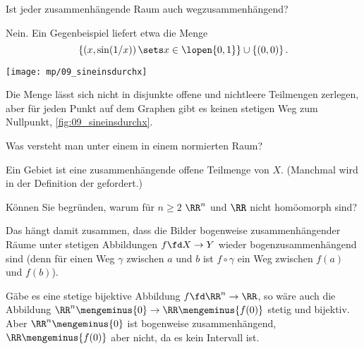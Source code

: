 \begin{frage}
  Ist jeder zusammenhängende Raum auch wegzusammenhängend?
\end{frage}

\begin{antwort}
  Nein. Ein Gegenbeispiel liefert etwa die Menge  
  \[
  \left\{  \left(x, \sin (1/x) \right)\sets 
    x\in \lopen{0,1} \right\} \cup 
  \left\{ ( 0, 0 ) \right\}.
  \]

  \begin{center}
    \texttt{[image: mp/09\_sineinsdurchx]}
    \label{fig:09_sineinsdurchx}
  \end{center}

  Die Menge lässt sich nicht in disjunkte offene 
  und nichtleere Teilmengen zerlegen, aber für jeden Punkt auf 
  dem Graphen gibt es keinen stetigen Weg zum Nullpunkt, \sieheAbbildung 
  \ref{fig:09_sineinsdurchx}.
  \AntEnd
\end{antwort}

\begin{frage}
  Was versteht man unter einem  in einem normierten Raum?
\end{frage}

\begin{antwort}
  Ein Gebiet ist eine zusammenhängende offene Teilmenge von $X$. 
  (Manchmal wird in der Definition der  
  gefordert.)
  \AntEnd
\end{antwort}

\begin{frage}\heavy{}
  Können Sie begründen, 
  warum für $n\ge 2$ $\RR^n$ und $\RR$ nicht homöomorph sind?
\end{frage}  

\begin{antwort}
  
  Das hängt damit zusammen, dass die Bilder 
  bogenweise zusammenhängender Räume unter stetigen Abbildungen 
  $f\fd X\to Y$ wieder bogenzusammenhängend sind (denn für einen Weg 
  $\gamma$ zwischen $a$ und $b$ ist $f \circ \gamma$ ein Weg 
  zwischen $f(a)$ und $f(b)$). 

  Gäbe es eine stetige bijektive  
  Abbildung $f \fd \RR^n \to \RR$, so wäre auch 
  die Abbildung $\RR^n \mengeminus \{ 0 \} 
  \to \RR \mengeminus \{ f(0) \}$ stetig und bijektiv. 
  Aber $\RR^n \mengeminus \{ 0 \}$ ist bogenweise zusammenhängend, 
  $\RR \mengeminus \{ f(0) \}$ aber nicht, da es kein Intervall ist.
  \AntEnd    
\end{antwort}



